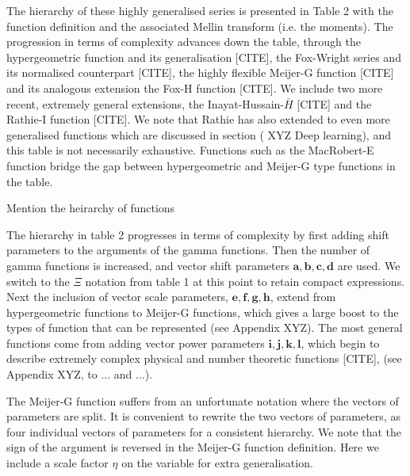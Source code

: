\documentclass{article}
\begin{document}
The hierarchy of these highly generalised series is presented in Table 2 with the function definition and the associated Mellin transform (i.e. the moments). The progression in terms of complexity advances down the table, through the hypergeometric function and its generalisation [CITE], the Fox-Wright series and its normalised counterpart [CITE], the highly flexible Meijer-G function [CITE] and its analogous extension the Fox-H function [CITE]. We include two more recent, extremely general extensions, the Inayat-Hussain-$\bar{H}$ [CITE] and the Rathie-I function [CITE]. We note that Rathie has also extended to even more generalised functions \citep{Rathie2013} which are discussed in section ({\color{red} XYZ Deep learning}), and this table is not necessarily exhaustive. Functions such as the MacRobert-E function bridge the gap between hypergeometric and Meijer-G  type functions in the table. 

{\color{red} Mention the heirarchy of functions}

The hierarchy in table 2 progresses in terms of complexity by first adding shift parameters to the arguments of the gamma functions. Then the number of gamma functions is increased, and vector shift parameters $\mathbf{a,b,c,d}$ are used. We switch to the $\Xi$ notation from table 1 at this point to retain compact expressions. Next the inclusion of vector scale parameters, $\mathbf{e,f,g,h}$, extend from hypergeometric functions to Meijer-G functions, which gives a large boost to the types of function that can be represented (see Appendix {\color{red}XYZ}). The most general functions come from adding vector power parameters $\mathbf{i,j,k,l}$, which begin to describe extremely complex physical and number theoretic functions [CITE], (see Appendix {\color{red}XYZ, to ... and ...}).


The Meijer-G function suffers from an unfortunate notation where the vectors of parameters are split. It is convenient to rewrite the two vectors of parameters, as four individual vectors of parameters for a consistent hierarchy. We note that the sign of the argument is reversed in the Meijer-G function definition. Here we include a scale factor $\eta$ on the variable for extra generalisation. 
\end{document}

